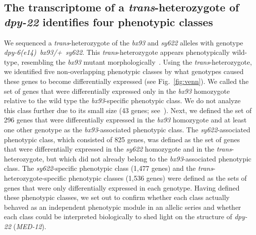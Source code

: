 \documentclass[10pt, twocolumn]{article}
\newcommand{\gene}[1]{\mbox{\emph{#1}}}
\newcommand{\dpy}{\gene{dpy-22} (\emph{MED-12})}
\begin{document}
\subsection*{The transcriptome of a \emph{trans}-heterozygote of \gene{dpy-22}
             identifies four phenotypic classes}
We sequenced a \emph{trans}-heterozygote of the \emph{bx93} and \emph{sy622}
alleles with genotype \gene{dpy-6(e14) bx93/+ sy622}. This
\emph{trans}-heterozygote appears phenotypically wild-type, resembling the
\emph{bx93} mutant morphologically~\cite{Moghal2003}. Using the
\emph{trans}-heterozygote, we identified five non-overlapping phenotypic classes
by what genotypes caused these genes to become differentially expressed (see
Fig.~\ref{fig:venn}). We called the set of genes that were differentially
expressed only in the \emph{bx93} homozygote relative to the wild type the
\emph{bx93}-specific phenotypic class. We do not analyze this class further due
to its small size (43 genes; see~). Next, we defined
the set of 296 genes that were differentially expressed in the \emph{bx93}
homozygote and at least one other genotype as the \emph{bx93}-associated
phenotypic class. The \emph{sy622}-associated phenotypic class, which consisted
of 825 genes, was defined as the set of genes that were differentially expressed
in the \emph{sy622} homozygote and in the \emph{trans}-heterozygote, but which
did not already belong to the \emph{bx93}-associated phenotypic class. The
\emph{sy622}-specific phenotypic class (1,477 genes) and the
\emph{trans}-heterozygote-specific phenotypic classes (1,536 genes) were defined
as the sets of genes that were only differentially expressed in each genotype.
Having defined these phenotypic classes, we set out to confirm whether each
class actually behaved as an independent phenotypic module in an allelic series
and whether each class could be interpreted biologically to shed light on the
structure of \dpy{}.
\end{document}
